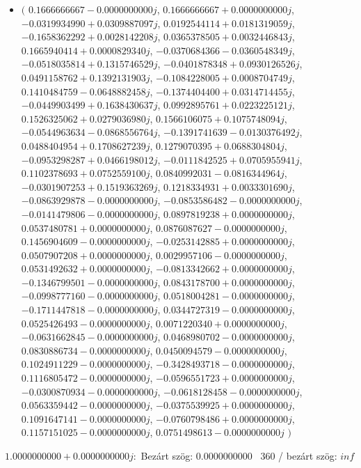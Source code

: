 \documentclass[14pt,a4paper]{article}
\begin{document}
\begin{itemize}
\item
$\big($
$0.1666666667-0.0000000000j$, $0.1666666667+0.0000000000j$, $-0.0319934990+0.0309887097j$, $0.0192544114+0.0181319059j$, $-0.1658362292+0.0028142208j$, $0.0365378505+0.0032446843j$, $0.1665940414+0.0000829340j$, $-0.0370684366-0.0360548349j$, $-0.0518035814+0.1315746529j$, $-0.0401878348+0.0930126526j$, $0.0491158762+0.1392131903j$, $-0.1084228005+0.0008704749j$, $0.1410484759-0.0648882458j$, $-0.1374404400+0.0314714455j$, $-0.0449903499+0.1638430637j$, $0.0992895761+0.0223225121j$, $0.1526325062+0.0279036980j$, $0.1566106075+0.1075748094j$, $-0.0544963634-0.0868556764j$, $-0.1391741639-0.0130376492j$, $0.0488404954+0.1708627239j$, $0.1279070395+0.0688304804j$, $-0.0953298287+0.0466198012j$, $-0.0111842525+0.0705955941j$, $0.1102378693+0.0752559100j$, $0.0840992031-0.0816344964j$, $-0.0301907253+0.1519363269j$, $0.1218334931+0.0033301690j$, $-0.0863929878-0.0000000000j$, $-0.0853586482-0.0000000000j$, $-0.0141479806-0.0000000000j$, $0.0897819238+0.0000000000j$, $0.0537480781+0.0000000000j$, $0.0876087627-0.0000000000j$, $0.1456904609-0.0000000000j$, $-0.0253142885+0.0000000000j$, $0.0507907208+0.0000000000j$, $0.0029957106-0.0000000000j$, $0.0531492632+0.0000000000j$, $-0.0813342662+0.0000000000j$, $-0.1346799501-0.0000000000j$, $0.0843178700+0.0000000000j$, $-0.0998777160-0.0000000000j$, $0.0518004281-0.0000000000j$, $-0.1711447818-0.0000000000j$, $0.0344727319-0.0000000000j$, $0.0525426493-0.0000000000j$, $0.0071220340+0.0000000000j$, $-0.0631662845-0.0000000000j$, $0.0468980702-0.0000000000j$, $0.0830886734-0.0000000000j$, $0.0450094579-0.0000000000j$, $0.1024911229-0.0000000000j$, $-0.3428493718-0.0000000000j$, $0.1116805472-0.0000000000j$, $-0.0596551723+0.0000000000j$, $-0.0300870934-0.0000000000j$, $-0.0618128458-0.0000000000j$, $0.0563359442-0.0000000000j$, $-0.0375539925+0.0000000000j$, $0.1091647141-0.0000000000j$, $-0.0760798486+0.0000000000j$, $0.1157151025-0.0000000000j$, $0.0751498613-0.0000000000j$
$\big)$
\end{itemize}
$1.0000000000+0.0000000000j$:\
Bezárt szög: $0.0000000000$ \
360 / bezárt szög: $inf$\
\end{document}
